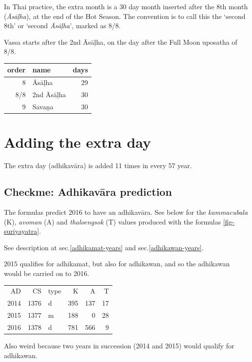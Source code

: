 \documentclass[11pt,oneside]{memoir-article}
\begin{document}
In Thai practice, the extra month is a 30 day month inserted after the
8th month (\emph{Āsāḷha}), at the end of the Hot Season. The convention is
to call this the `second 8th' or `second \emph{Āsāḷha}', marked as 8/8.

Vassa starts after the 2nd Āsāḷha, on the day after the Full Moon
uposatha of 8/8.

\begin{center}
\begin{tabular}{rlr}
order & name & days\\
\hline
8 & Āsāḷha & 29\\
8/8 & 2nd Āsāḷha & 30\\
9 & Savaṇa & 30\\
\end{tabular}
\end{center}
\section{Adding the extra day}
\label{sec-1-3}
\label{adding-extra-day}

The extra day (adhikavāra) is added 11 times in every 57 year.

\subsection{Checkme: Adhikavāra prediction}
\label{sec-1-3-1}
\label{adhikavara-prediction}

The formulas predict 2016 to have an
adhikavāra. See below for the
\emph{kammacubala} (K), \emph{avoman} (A) and \emph{thaloengsok} (T) values produced
with the formulas \ref{fig-suriyayatra}.

See description at sec.\ref{adhikamat-years} and
sec.\ref{adhikawan-years}.

2015 qualifies for adhikamat, but also for adhikawan, and so the
adhikawan would be carried on to 2016.

\begin{center}
\begin{tabular}{rrlrrr}
AD & CS & type & K & A & T\\
2014 & 1376 & d & 395 & 137 & 17\\
2015 & 1377 & m & 188 & 0 & 28\\
2016 & 1378 & d & 781 & 566 & 9\\
\end{tabular}
\end{center}

Also weird because two years in succession (2014 and 2015) would
qualify for adhikawan.
\end{document}
